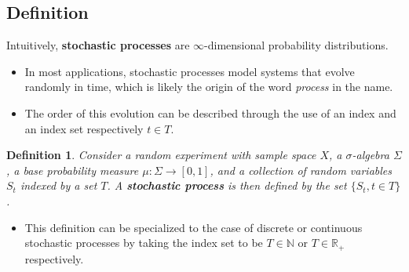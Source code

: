 \subsection{Definition}
\begin{frame}
Intuitively, \textbf{stochastic processes} are $\infty$-dimensional probability distributions.
\end{frame}

\begin{frame}
\begin{itemize}
\item In most applications, stochastic processes model systems that evolve randomly in time, which is likely the origin of the word \emph{process} in the name. 
\item The order of this evolution can be described through the use of an index and an index set respectively $t \in T$.
\end{itemize}

\newtheorem{stpo}{Definition}
\begin{stpo}
Consider a random experiment with sample space $X$, a $\sigma$-algebra $\Sigma$, a base probability measure $\mu : \Sigma \rightarrow [0,1]$, and a collection of random variables $S_t$ indexed by a set $T$. A \textbf{stochastic process} is then defined by the set $\{S_t, t \in T\}$.
\end{stpo}
\begin{itemize}
\item This definition can be specialized to the case of discrete or continuous stochastic processes by taking the index set to be $T \in \mathbb{N}$ or $T \in \mathbb{R}_+$ respectively.
\end{itemize}
\end{frame}

